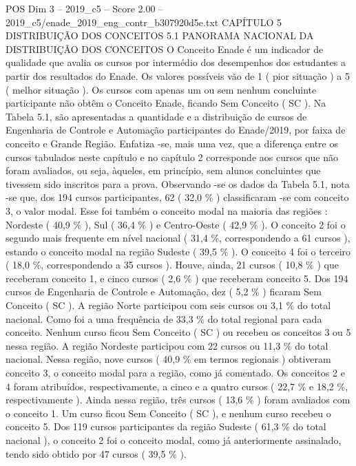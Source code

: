 \begin{textsample}{POS Dim 3 – 2019\_c5 – Score 2.00 – 2019\_c5/enade\_2019\_eng\_contr\_b307920d5e.txt}  \label{ex:f3_pos_078}
CAPÍTULO 5 DISTRIBUIÇÃO DOS CONCEITOS 5.1 PANORAMA NACIONAL DA DISTRIBUIÇÃO DOS CONCEITOS O Conceito Enade é um indicador de qualidade que avalia os cursos por intermédio dos desempenhos dos estudantes a partir dos resultados do Enade.
Os valores possíveis vão de 1 ( pior situação ) a 5 ( melhor situação ).
Os cursos com apenas um ou sem nenhum concluinte participante não obtêm o Conceito Enade, ficando Sem Conceito ( SC ).
Na Tabela 5.1, são apresentadas a quantidade e a distribuição de cursos de Engenharia de Controle e Automação participantes do Enade/2019, por faixa de conceito e Grande Região.
Enfatiza -se, mais uma vez, que a diferença entre os cursos tabulados neste capítulo e no capítulo 2 corresponde aos cursos que não foram avaliados, ou seja, àqueles, em princípio, sem alunos concluintes que tivessem sido inscritos para a prova.
Observando -se os dados da Tabela 5.1, nota -se que, dos 194 cursos participantes, 62 ( 32,0 \% ) classificaram -se com conceito 3, o valor modal.
Esse foi também o conceito modal na maioria das regiões : Nordeste ( 40,9 \% ), Sul ( 36,4 \% ) e Centro-Oeste ( 42,9 \% ).
O conceito 2 foi o segundo mais frequente em nível nacional ( 31,4 \%, correspondendo a 61 cursos ), estando o conceito modal na região Sudeste ( 39,5 \% ).
O conceito 4 foi o terceiro ( 18,0 \%, correspondendo a 35 cursos ).
Houve, ainda, 21 cursos ( 10,8 \% ) que receberam conceito 1, e cinco cursos ( 2,6 \% ) que receberam conceito 5.
Dos 194 cursos de Engenharia de Controle e Automação, dez ( 5,2 \% ) ficaram Sem Conceito ( SC ).
A região Norte participou com seis cursos ou 3,1 \% do total nacional.
Como foi a uma frequência de 33,3 \% do total regional para cada conceito.
Nenhum curso ficou Sem Conceito ( SC ) ou recebeu os conceitos 3 ou 5 nessa região.
A região Nordeste participou com 22 cursos ou 11,3 \% do total nacional.
Nessa região, nove cursos ( 40,9 \% em termos regionais ) obtiveram conceito 3, o conceito modal para a região, como já comentado.
Os conceitos 2 e 4 foram atribuídos, respectivamente, a cinco e a quatro cursos ( 22,7 \% e 18,2 \%, respectivamente ).
Ainda nessa região, três cursos ( 13,6 \% ) foram avaliados com o conceito 1.
Um curso ficou Sem Conceito ( SC ), e nenhum curso recebeu o conceito 5.
Dos 119 cursos participantes da região Sudeste ( 61,3 \% do total nacional ), o conceito 2 foi o conceito modal, como já anteriormente assinalado, tendo sido obtido por 47 cursos ( 39,5 \% ).

\end{textsample}
